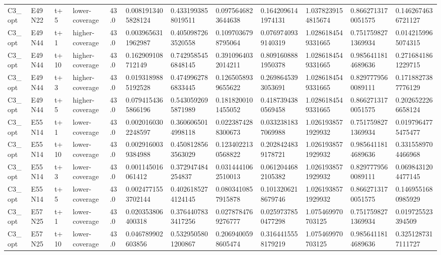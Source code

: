 \begin{landscape}
\begin{longtable}{llllllllllll}
C3\_opt & E49N22 & t+5 & lower-coverage & 43.0 & 0.0081913405828124 & 0.4331993858019511 & 0.0975646823644638 & 0.1642096141974131 & 1.0378239154815674 & 0.8662713170051575 & 0.1462674636721127 \\
C3\_opt & E49N44 & t+1 & higher-coverage & 43.0 & 0.0039656311962987 & 0.4050987263520558 & 0.1097036798795064 & 0.0769740939140319 & 1.0286184549331665 & 0.7517598271369934 & 0.0142159965074315 \\
C3\_opt & E49N44 & t+10 & higher-coverage & 43.0 & 0.162909108712149 & 0.7429585456848145 & 0.3910964032014211 & 0.8091608881950378 & 1.0286184549331665 & 0.9856411814689636 & 0.2716841861229715 \\
C3\_opt & E49N44 & t+3 & higher-coverage & 43.0 & 0.0193189885192528 & 0.4749962786833445 & 0.1265058939655622 & 0.2698645393053691 & 1.0286184549331665 & 0.8297779560089111 & 0.1718827387776129 \\
C3\_opt & E49N44 & t+5 & higher-coverage & 43.0 & 0.0794154365866196 & 0.5430592695871989 & 0.1818200101455052 & 0.4187394380569458 & 1.0286184549331665 & 0.8662713170051575 & 0.2026522266658124 \\
C3\_opt & E55N14 & t+1 & lower-coverage & 43.0 & 0.0020160302248597 & 0.3606065014998118 & 0.0223874288300673 & 0.0332381837069988 & 1.0261938571929932 & 0.7517598271369934 & 0.0197964775475477 \\
C3\_opt & E55N14 & t+10 & lower-coverage & 43.0 & 0.0029160039384988 & 0.4508128563563029 & 0.1234022130568822 & 0.2028424839178721 & 1.0261938571929932 & 0.9856411814689636 & 0.3315589704466968 \\
C3\_opt & E55N14 & t+3 & lower-coverage & 43.0 & 0.001145016061412 & 0.372947484254837 & 0.0314441062510013 & 0.0612044682105382 & 1.0261938571929932 & 0.8297779560089111 & 0.0698431204477145 \\
C3\_opt & E55N14 & t+5 & lower-coverage & 43.0 & 0.0024771553702144 & 0.4026185274124145 & 0.0803410857915878 & 0.1013206218679746 & 1.0261938571929932 & 0.8662713170051575 & 0.1469551680985929 \\
C3\_opt & E57N25 & t+1 & lower-coverage & 43.0 & 0.020353806400318 & 0.3764407833417256 & 0.0278784769276777 & 0.0259737850477298 & 1.075469970703125 & 0.7517598271369934 & 0.019725523394509 \\
C3\_opt & E57N25 & t+10 & lower-coverage & 43.0 & 0.046789902603856 & 0.5329505801200867 & 0.2069400598605474 & 0.3164415558179219 & 1.075469970703125 & 0.9856411814689636 & 0.3251287317111727 \\

\end{longtable}
\end{landscape}
